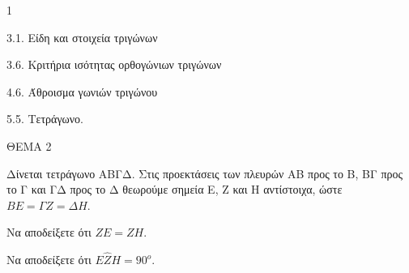 \begin{ylh}{1}
    \item 3.1. Είδη και στοιχεία τριγώνων
    \item 3.6. Κριτήρια ισότητας ορθογώνιων τριγώνων
    \item 4.6. Άθροισμα γωνιών τριγώνου
    \item 5.5. Τετράγωνο.
\end{ylh}

ΘΕΜΑ 2

Δίνεται τετράγωνο ΑΒΓΔ. Στις προεκτάσεις των πλευρών ΑΒ προς το Β, ΒΓ προς το Γ και ΓΔ προς το Δ θεωρούμε σημεία Ε, Ζ και Η αντίστοιχα, ώστε $ΒΕ = \Gamma Ζ = \Delta Η$.

\begin{alist}
\item Να αποδείξετε ότι $ΖΕ = ΖΗ$. 

\item Να αποδείξετε ότι $Ε\widehat{Ζ}Η = 90^{ο}$. 


\begin{center}
\end{center}
\end{alist}
